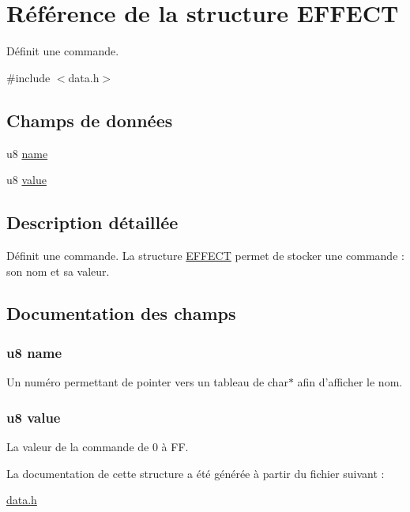 \hypertarget{struct_e_f_f_e_c_t}{
\section{Référence de la structure EFFECT}
\label{struct_e_f_f_e_c_t}
}


Définit une commande.  




{\ttfamily \#include $<$data.h$>$}

\subsection*{Champs de données}
\begin{DoxyCompactItemize}
\item 
u8 \hyperlink{struct_e_f_f_e_c_t_a9a177c9d0090cd5a668ffd2271075fc4}{name}
\item 
u8 \hyperlink{struct_e_f_f_e_c_t_a9eea2829c6264b2ee423f6eaddcc3fdb}{value}
\end{DoxyCompactItemize}


\subsection{Description détaillée}
Définit une commande. La structure \hyperlink{struct_e_f_f_e_c_t}{EFFECT} permet de stocker une commande : son nom et sa valeur. 

\subsection{Documentation des champs}
\hypertarget{struct_e_f_f_e_c_t_a9a177c9d0090cd5a668ffd2271075fc4}{
\subsubsection[{name}]{\setlength{\rightskip}{0pt plus 5cm}u8 {\bf name}}}
\label{struct_e_f_f_e_c_t_a9a177c9d0090cd5a668ffd2271075fc4}
Un numéro permettant de pointer vers un tableau de char$\ast$ afin d'afficher le nom. \hypertarget{struct_e_f_f_e_c_t_a9eea2829c6264b2ee423f6eaddcc3fdb}{
\subsubsection[{value}]{\setlength{\rightskip}{0pt plus 5cm}u8 {\bf value}}}
\label{struct_e_f_f_e_c_t_a9eea2829c6264b2ee423f6eaddcc3fdb}
La valeur de la commande de 0 à FF. 

La documentation de cette structure a été générée à partir du fichier suivant :\begin{DoxyCompactItemize}
\item 
\hyperlink{data_8h}{data.h}\end{DoxyCompactItemize}
